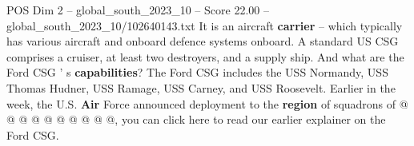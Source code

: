\begin{textsample}{POS Dim 2 – global\_south\_2023\_10 – Score 22.00 – global\_south\_2023\_10/102640143.txt}
It is an aircraft \textbf{carrier} -- which typically has various aircraft and onboard defence systems onboard.
A standard US CSG comprises a cruiser, at least two destroyers, and a supply ship.
And what are the Ford CSG ' s \textbf{capabilities}?
The Ford CSG includes the USS Normandy, USS Thomas Hudner, USS Ramage, USS Carney, and USS Roosevelt.
Earlier in the week, the U.S. \textbf{Air} Force announced deployment to the \textbf{region} of squadrons of @ @ @ @ @ @ @ @ @ @, you can click here to read our earlier explainer on the Ford CSG.

\end{textsample}
